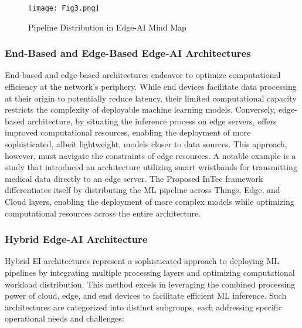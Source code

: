 \documentclass[11pt]{article}
\begin{document}
	\begin{figure}[h]
		\centering
		\texttt{[image: Fig3.png]}
		\caption{Pipeline Distribution in Edge-AI Mind Map}
	\end{figure}
	
	\subsubsection{End-Based and Edge-Based Edge-AI Architectures}
	End-based and edge-based architectures endeavor to optimize computational efficiency at the network's periphery. While end devices facilitate data processing at their origin to potentially reduce latency, their limited computational capacity restricts the complexity of deployable machine learning models. Conversely, edge-based architecture, by situating the inference process on edge servers, offers improved computational resources, enabling the deployment of more sophisticated, albeit lightweight, models closer to data sources. This approach, however, must navigate the constraints of edge resources. A notable example is a study \cite{c27} that introduced an architecture utilizing smart wristbands for transmitting medical data directly to an edge server. The Proposed InTec framework differentiates itself by
	distributing the ML pipeline across Things, Edge, and Cloud layers, enabling the
	deployment of more complex models while optimizing computational resources
	across the entire architecture.
	
	\subsubsection{Hybrid Edge-AI Architecture}
	Hybrid EI architectures represent a sophisticated approach to deploying ML pipelines by integrating multiple processing layers and optimizing computational workload distribution. This method excels in leveraging the combined processing power
	of cloud, edge, and end devices to facilitate efficient ML inference. Such architectures are categorized into distinct subgroups, each addressing specific operational
	needs and challenges:
	
\end{document}
